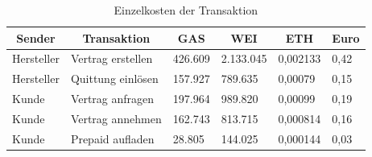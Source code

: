\begin{table}[h]
\begin{adjustwidth}{-.5in}{-.5in}
\begin{center}
\begin{tabular}{@{}llllll@{}}
\toprule
\multicolumn{1}{c}{\textbf{Sender}} & \multicolumn{1}{c}{\textbf{Transaktion}} & \multicolumn{1}{c}{\textbf{GAS}} & \multicolumn{1}{c}{\textbf{WEI}} & \multicolumn{1}{c}{\textbf{ETH}} & \multicolumn{1}{c}{\textbf{Euro}} \\ \midrule
Hersteller & Vertrag erstellen & 426.609 & 2.133.045 & 0,002133 & 0,42 \\
Hersteller & Quittung einlösen & 157.927 & 789.635 & 0,00079 & 0,15 \\ \midrule
Kunde & Vertrag anfragen & 197.964 & 989.820 & 0,00099 & 0,19 \\
Kunde & Vertrag annehmen & 162.743 & 813.715 & 0,000814 & 0,16 \\
Kunde & Prepaid aufladen & 28.805 & 144.025 & 0,000144 & 0,03 \\ \bottomrule
\end{tabular}
\caption{Einzelkosten der Transaktion}
\label{tab:calc2}
\end{center}
\end{adjustwidth}
\end{table}


